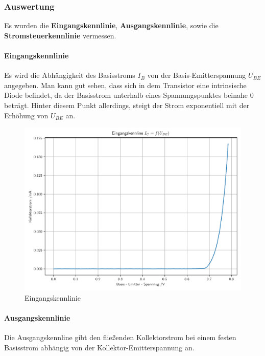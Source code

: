 \documentclass[12pt,twoside,a4paper]{scrartcl}
\begin{document}
		\subsubsection{Auswertung}

        Es wurden die \textbf{Eingangskennlinie}, \textbf{Ausgangskennlinie}, sowie die \textbf{Stromsteuerkennlinie} vermessen.

        \paragraph{Eingangskennlinie}

					Es wird die Abhängigkeit des Basisstroms $I_B$ von der Basis-Emitterspannung $U_{BE}$ angegeben. Man kann gut sehen, dass sich in dem Transistor eine intrinsische Diode befindet, da der Basisstrom unterhalb eines Spannungspunktes beinahe $0$ beträgt. Hinter diesem Punkt allerdings, steigt der Strom exponentiell mit der Erhöhung von $U_{BE}$ an.

	        \begin{figure}[H]
	            \centering
	            \includegraphics[width = 0.9 \textwidth]{Plots/Transistor/Einganskennline}
	            \caption{Eingangskennlinie}
	        \end{figure}



		    \paragraph{Ausgangskennlinie}

					Die Ausgangskennline gibt den fließenden Kollektorstrom bei einem festen Basisstrom abhängig von der Kollektor-Emitterspannung an.
\end{document}
